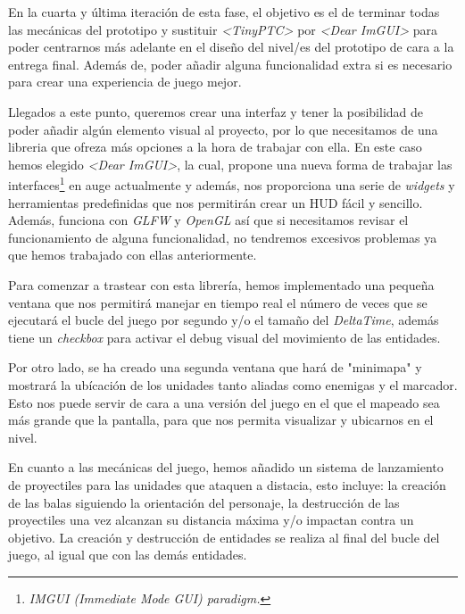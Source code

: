 
En la cuarta y última iteración de esta fase, el objetivo es el de terminar todas las mecánicas del prototipo
y sustituir \textit{\textless TinyPTC\textgreater} por \textit{\textless Dear ImGUI\textgreater} para poder
centrarnos más adelante en el diseño del nivel/es del prototipo de cara a la entrega final. Además de, poder
añadir alguna funcionalidad extra si es necesario para crear una experiencia de juego mejor.

Llegados a este punto, queremos crear una interfaz y tener la posibilidad de poder añadir algún elemento
visual al proyecto, por lo que necesitamos de una libreria que ofreza más opciones a la hora de trabajar
con ella. En este caso hemos elegido \textit{\textless Dear ImGUI\textgreater}, la cual, propone una nueva
forma de trabajar las interfaces\footnote{\textit{IMGUI (Immediate Mode GUI) paradigm.}} en auge actualmente
y además, nos proporciona una serie de \textit{widgets} y herramientas predefinidas que nos permitirán crear 
un HUD fácil y sencillo.
Además, funciona con \textit{GLFW} y \textit{OpenGL} así que si necesitamos revisar el funcionamiento de
alguna funcionalidad, no tendremos excesivos problemas ya que hemos trabajado con ellas anteriormente.


Para comenzar a trastear con esta librería, hemos implementado una pequeña ventana que nos permitirá manejar
en tiempo real el número de veces que se ejecutará el bucle del juego por segundo y/o el tamaño del 
\textit{DeltaTime}, además tiene un \textit{checkbox} para activar el debug visual del movimiento de las
entidades.


Por otro lado, se ha creado una segunda ventana que hará de "minimapa" y mostrará la ubícación de los unidades
tanto aliadas como enemigas y el marcador. Esto nos puede servir de cara a una versión del juego en el que el
mapeado sea más grande que la pantalla, para que nos permita visualizar y ubicarnos en el nivel.


En cuanto a las mecánicas del juego, hemos añadido un sistema de lanzamiento de proyectiles para las unidades
que ataquen a distacia, esto incluye: la creación de las balas siguiendo la orientación del personaje, la
destrucción de las proyectiles una vez alcanzan su distancia máxima y/o impactan contra un objetivo.
La creación y destrucción de entidades se realiza al final del bucle del juego, al igual que con las
demás entidades. 

